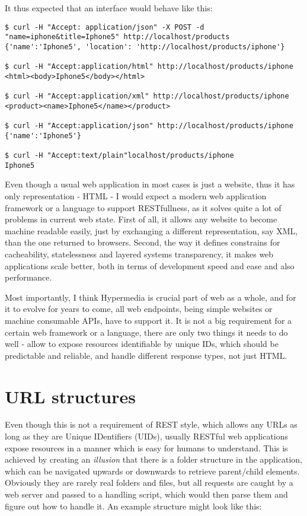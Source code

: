 It thus expected that an interface would behave like this:

\begin{codelisting}
\begin{verbatim}
$ curl -H "Accept: application/json" -X POST -d "name=iphone&title=Iphone5" http://localhost/products
{'name':'Iphone5', 'location': 'http://localhost/products/iphone'}

$ curl -H "Accept:application/html" http://localhost/products/iphone
<html><body>Iphone5</body></html>

$ curl -H "Accept:application/xml" http://localhost/products/iphone
<product><name>Iphone5</name></product>

$ curl -H "Accept:application/json" http://localhost/products/iphone
{'name':'Iphone5'}

$ curl -H "Accept:text/plain"localhost/products/iphone
Iphone5
\end{verbatim}
\end{codelisting}

Even though a usual web application in most cases is just a website, thus it has only representation - HTML - I would expect a modern web application framework or a language to support RESTfullness, as it solves quite a lot of problems in current web state. First of all, it allows any website to become machine readable easily, just by exchanging a different representation, say XML, than the one returned to browsers. Second, the way it defines constrains for cacheability, statelessness and layered systems transparency, it makes web applications scale better, both in terms of development speed and ease and also performance. 

Most importantly, I think Hypermedia\citep{rest} is crucial part of web as a whole, and for it to evolve for years to come, all web endpoints, being simple websites or machine consumable APIs, have to support it. It is not a big requirement for a certain web framework or a language, there are only two things it needs to do well - allow to expose resources identifiable by unique IDs, which should be predictable and reliable, and handle different response types, not just HTML. 

\section{URL structures}

Even though this is not a requirement of REST style, which allows any URLs as long as they are Unique IDentifiers (UIDs), usually RESTful web applications expose resources in a manner which is easy for humans to understand. This is achieved by creating an \textit{illusion} that there is a folder structure in the application, which can be navigated upwards or downwards to retrieve parent/child elements. Obviously they are rarely real folders and files, but all requests are caught by a web server and passed to a handling script, which would then parse them and figure out how to handle it. An example structure might look like this:


